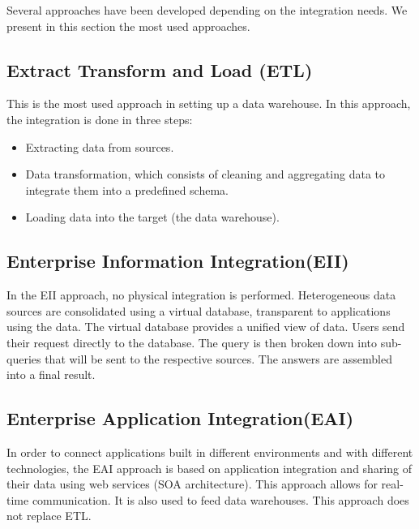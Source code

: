Several approaches have been developed depending on the integration needs. We present in this section the most used approaches\cite{naitEntropot}.
\subsection{Extract Transform and Load (ETL)}
This is the most used approach in setting up a data warehouse. In this approach, the integration is done in three steps:
\begin{itemize}
\item Extracting data from sources.
\item Data transformation, which consists of cleaning and aggregating data to integrate them into a predefined schema.
\item Loading data into the target (the data warehouse).
\end{itemize}
 
\subsection{Enterprise Information Integration(EII)}
In the EII approach, no physical integration is performed. Heterogeneous data sources are consolidated using a virtual database, transparent to applications using the data. The virtual database provides a unified view of data. Users send their request directly to the database. The query is then broken down into sub-queries that will be sent to the respective sources. The answers are assembled into a final result.
 
\subsection{Enterprise Application Integration(EAI)}
In order to connect applications built in different environments and with different technologies, the EAI approach is based on application integration and sharing of their data using web services (SOA architecture). This approach allows for real-time communication.
It is also used to feed data warehouses. This approach does not replace ETL.


